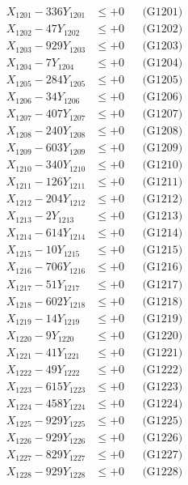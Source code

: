 \documentclass[a4paper,10pt]{article}
\begin{document}
{\begin{align}
\allowbreak
X_{1201} - 336Y_{1201} &\leq +0 && \text{(G1201)} \\
X_{1202} - 47Y_{1202} &\leq +0 && \text{(G1202)} \\
X_{1203} - 929Y_{1203} &\leq +0 && \text{(G1203)} \\
X_{1204} - 7Y_{1204} &\leq +0 && \text{(G1204)} \\
X_{1205} - 284Y_{1205} &\leq +0 && \text{(G1205)} \\
X_{1206} - 34Y_{1206} &\leq +0 && \text{(G1206)} \\
X_{1207} - 407Y_{1207} &\leq +0 && \text{(G1207)} \\
X_{1208} - 240Y_{1208} &\leq +0 && \text{(G1208)} \\
X_{1209} - 603Y_{1209} &\leq +0 && \text{(G1209)} \\
X_{1210} - 340Y_{1210} &\leq +0 && \text{(G1210)} \\
\allowbreak
X_{1211} - 126Y_{1211} &\leq +0 && \text{(G1211)} \\
X_{1212} - 204Y_{1212} &\leq +0 && \text{(G1212)} \\
X_{1213} - 2Y_{1213} &\leq +0 && \text{(G1213)} \\
X_{1214} - 614Y_{1214} &\leq +0 && \text{(G1214)} \\
X_{1215} - 10Y_{1215} &\leq +0 && \text{(G1215)} \\
X_{1216} - 706Y_{1216} &\leq +0 && \text{(G1216)} \\
X_{1217} - 51Y_{1217} &\leq +0 && \text{(G1217)} \\
X_{1218} - 602Y_{1218} &\leq +0 && \text{(G1218)} \\
X_{1219} - 14Y_{1219} &\leq +0 && \text{(G1219)} \\
X_{1220} - 9Y_{1220} &\leq +0 && \text{(G1220)} \\
\allowbreak
X_{1221} - 41Y_{1221} &\leq +0 && \text{(G1221)} \\
X_{1222} - 49Y_{1222} &\leq +0 && \text{(G1222)} \\
X_{1223} - 615Y_{1223} &\leq +0 && \text{(G1223)} \\
X_{1224} - 458Y_{1224} &\leq +0 && \text{(G1224)} \\
X_{1225} - 929Y_{1225} &\leq +0 && \text{(G1225)} \\
X_{1226} - 929Y_{1226} &\leq +0 && \text{(G1226)} \\
X_{1227} - 829Y_{1227} &\leq +0 && \text{(G1227)} \\
X_{1228} - 929Y_{1228} &\leq +0 && \text{(G1228)} \\

\end{align}}
\end{document}

